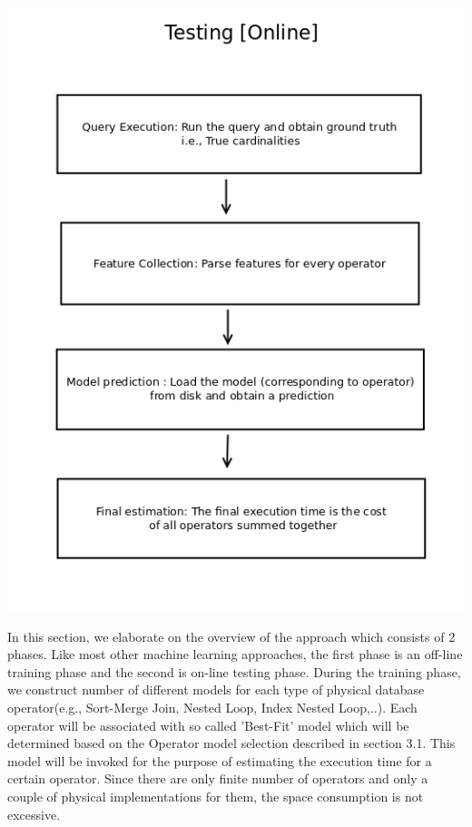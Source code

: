 \documentclass{article}
\begin{document}
\begin{multicols}{2}
	\includegraphics[scale=0.3]{testing.png}

	In this section, we elaborate on the overview of the approach which consists of 2 phases. Like 
	most other machine learning approaches, the first phase is an off-line training phase and the 
	second is on-line testing phase.
	During the training phase, we construct number of different 
	models for each type of physical database operator(e.g.,  Sort-Merge Join, Nested Loop, Index Nested 		Loop,..). Each operator will be associated with so called 'Best-Fit' model which will be determined 
	based on the Operator model selection described in section 3.1. This model will be invoked for the
	purpose of estimating the execution time for a certain operator. Since there are only finite number of 	operators and only a couple of physical implementations for them, the space consumption is not 				excessive. 
	\\
	

\end{multicols}
\end{document}
